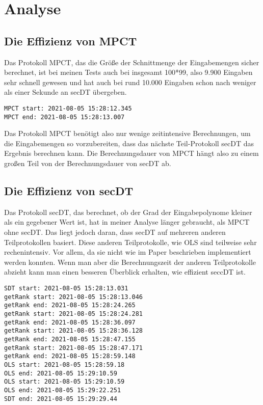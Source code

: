 \chapter{Analyse}


\section{Die Effizienz von MPCT}
Das Protokoll MPCT, das die Größe der Schnittmenge der Eingabemengen sicher berechnet, ist bei meinen Tests auch bei insgesamt 100*99, also 9.900 Eingaben sehr schnell gewesen und hat auch bei rund 10.000 Eingaben schon nach weniger als einer Sekunde an secDT übergeben.\\
\begin{lstlisting}[caption = Ausschnitt von Rückgabe von Test MPCTTestBig. Dauer von MPCT ohne SDT]
MPCT start: 2021-08-05 15:28:12.345
MPCT end: 2021-08-05 15:28:13.007
\end{lstlisting}
Das Protokoll MPCT benötigt also nur wenige zeitintensive Berechnungen, um die Eingabemengen so vorzubereiten, dass das nächste Teil-Protokoll secDT das Ergebnis berechnen kann. Die Berechnungsdauer von MPCT hängt also zu einem großen Teil von der Berechnungsdauer von secDT ab. 

\section{Die Effizienz von secDT}
Das Protokoll secDT, das berechnet, ob der Grad der Eingabepolynome kleiner als ein gegebener Wert ist, hat in meiner Analyse länger gebraucht, als MPCT ohne secDT. Das liegt jedoch daran, dass secDT auf mehreren anderen Teilprotokollen basiert. Diese anderen Teilprotokolle, wie OLS sind teilweise sehr rechenintensiv. Vor allem, da sie nicht wie im Paper beschrieben implementiert werden konnten. Wenn man aber die Berechnungszeit der anderen Teilprotokolle abzieht kann man einen besseren Überblick erhalten, wie effizient seccDT ist.

\begin{lstlisting}[caption = Ausschnitt von Rückgabe von Test MPCTTestBig. Dauer von SDT]
SDT start: 2021-08-05 15:28:13.031
getRank start: 2021-08-05 15:28:13.046
getRank end: 2021-08-05 15:28:24.265
getRank start: 2021-08-05 15:28:24.281
getRank end: 2021-08-05 15:28:36.097
getRank start: 2021-08-05 15:28:36.128
getRank end: 2021-08-05 15:28:47.155
getRank start: 2021-08-05 15:28:47.171
getRank end: 2021-08-05 15:28:59.148
OLS start: 2021-08-05 15:28:59.18
OLS end: 2021-08-05 15:29:10.59
OLS start: 2021-08-05 15:29:10.59
OLS end: 2021-08-05 15:29:22.251
SDT end: 2021-08-05 15:29:29.44

\end{lstlisting}

